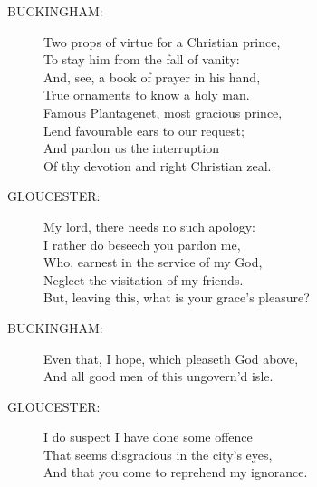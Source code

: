 \documentclass{article}
\begin{document}
\begin{description}
\item[BUCKINGHAM:] 
\hspace{1pt}Two props of virtue for a Christian prince,\\
\hspace{1pt}To stay him from the fall of vanity:\\
\hspace{1pt}And, see, a book of prayer in his hand,\\
\hspace{1pt}True ornaments to know a holy man.\\
\hspace{1pt}Famous Plantagenet, most gracious prince,\\
\hspace{1pt}Lend favourable ears to our request;\\
\hspace{1pt}And pardon us the interruption\\
\hspace{1pt}Of thy devotion and right Christian zeal.\\
\end{description}
\begin{description}
\item[GLOUCESTER:] 
\hspace{1pt}My lord, there needs no such apology:\\
\hspace{1pt}I rather do beseech you pardon me,\\
\hspace{1pt}Who, earnest in the service of my God,\\
\hspace{1pt}Neglect the visitation of my friends.\\
\hspace{1pt}But, leaving this, what is your grace's pleasure?\\
\end{description}
\begin{description}
\item[BUCKINGHAM:] 
\hspace{1pt}Even that, I hope, which pleaseth God above,\\
\hspace{1pt}And all good men of this ungovern'd isle.\\
\end{description}
\begin{description}
\item[GLOUCESTER:] 
\hspace{1pt}I do suspect I have done some offence\\
\hspace{1pt}That seems disgracious in the city's eyes,\\
\hspace{1pt}And that you come to reprehend my ignorance.\\
\end{description}
\end{document}
